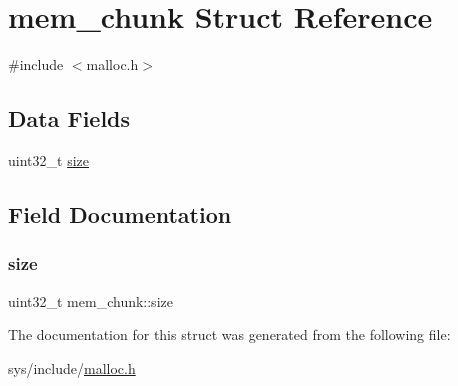 \hypertarget{structmem__chunk}{}\section{mem\+\_\+chunk Struct Reference}
\label{structmem__chunk}


{\ttfamily \#include $<$malloc.\+h$>$}

\subsection*{Data Fields}
\begin{DoxyCompactItemize}
\item 
uint32\+\_\+t \hyperlink{structmem__chunk_a6c249814794488c18a42bcf180e3c024}{size}
\end{DoxyCompactItemize}


\subsection{Field Documentation}
\mbox{\label{structmem__chunk_a6c249814794488c18a42bcf180e3c024}} 
\subsubsection{\texorpdfstring{size}{size}}
{\footnotesize\ttfamily uint32\+\_\+t mem\+\_\+chunk\+::size}



The documentation for this struct was generated from the following file\+:\begin{DoxyCompactItemize}
\item 
sys/include/\hyperlink{malloc_8h}{malloc.\+h}\end{DoxyCompactItemize}
